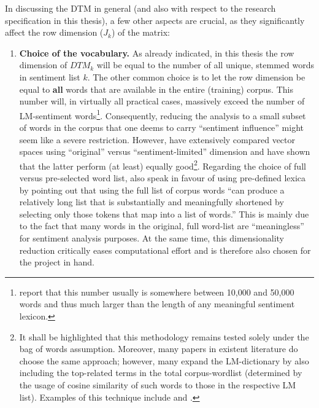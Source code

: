In discussing the DTM in general (and also with respect to the research specification in this thesis), a few other aspects are crucial, as they significantly affect the row dimension ($J_k$) of the matrix:
\begin{enumerate}[(1)]
\item \textbf{Choice of the vocabulary.} As already indicated, in this thesis the row dimension of $DTM_k$ will be equal to the number of all unique, stemmed words in sentiment list $k$. The other common choice is to let the row dimension be equal to \textbf{all} words that are available in the entire (training) corpus. This number will, in virtually all practical cases, massively exceed the number of LM-sentiment words\footnote{\textcite[274]{Jurafsky_Draft_2017} report that this number usually is somewhere between 10,000 and 50,000 words and thus much larger than the length of any meaningful sentiment lexicon.}. Consequently, reducing the analysis to a small subset of words in the corpus that one deems to carry \enquote{sentiment influence} might seem like a severe restriction. However, \textcite{TsaiWang2016} have extensively compared vector spaces using \enquote{original} versus \enquote{sentiment-limited} dimension and have shown that the latter perform (at least) equally good\footnote{It shall be highlighted that this methodology remains tested solely under the bag of words assumption. Moreover, many papers in existent literature do choose the same approach; however, many expand the LM-dictionary by also including the top-related terms in the total corpus-wordlist (determined by the usage of cosine similarity of such words to those in the respective LM list). Examples of this technique include \textcite{TsaiWang2014} and \textcite{Rekabsaz2017}.}. Regarding the choice of full versus pre-selected word list, also \textcite[1215]{LM-meta-2016} speak in favour of using pre-defined lexica by pointing out that using the full list of corpus words \enquote{can produce a relatively long list that is substantially and meaningfully shortened by selecting only those tokens that map into a list of words.} This is mainly due to the fact that many words in the original, full word-list are \enquote{meaningless} for sentiment analysis purposes. At the same time, this dimensionality reduction critically eases computational effort and is therefore also chosen for the project in hand. %


\end{enumerate}
